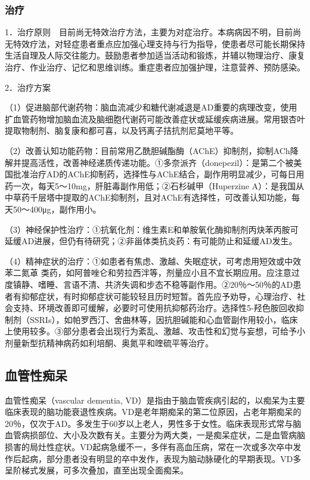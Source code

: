\subsubsection{治疗}

1．治疗原则　目前尚无特效治疗方法，主要为对症治疗。本病病因不明，目前尚无特效疗法，对轻症患者重点应加强心理支持与行为指导，使患者尽可能长期保持生活自理及人际交往能力。鼓励患者参加适当活动和锻炼，并辅以物理治疗、康复治疗、作业治疗、记忆和思维训练。重症患者应加强护理，注意营养、预防感染。

2．治疗方案

（1）促进脑部代谢药物：脑血流减少和糖代谢减退是AD重要的病理改变，使用扩血管药物增加脑血流及脑细胞代谢药可能改善症状或延缓疾病进展。常用银杏叶提取物制剂、脑复康和都可喜，以及钙离子拮抗剂尼莫地平等。

（2）改善认知功能药物：目前常用乙酰胆碱酯酶（AChE）抑制剂，抑制ACh降解并提高活性，改善神经递质传递功能。①多奈派齐（donepezil）：是第二个被美国批准治疗AD的AChE抑制药，选择性与AChE结合，副作用明显减少，可每日用药一次，每天5～10mg，肝脏毒副作用低；②石杉碱甲（Huperzine
A）：是我国从中草药千层塔中提取的AChE抑制剂，且对AChE有选择性，可改善认知功能，每天50～400μg，副作用小。

（3）神经保护性治疗：①抗氧化剂：维生素E和单胺氧化酶抑制剂丙炔苯丙胺可延缓AD进展，但仍有待研究；②非甾体类抗炎药：有可能防止和延缓AD发生。

（4）精神症状的治疗：①如患者有焦虑、激越、失眠症状，可考虑用短效或中效苯二氮䓬
类药，如阿普唑仑和劳拉西泮等，剂量应小且不宜长期应用。应注意过度镇静、嗜睡、言语不清、共济失调和步态不稳等副作用。②20％～50％的AD患者有抑郁症状，有时抑郁症状可能较轻且历时短暂。首先应予劝导，心理治疗、社会支持、环境改善即可缓解，必要时可使用抗抑郁药治疗。选择性5-羟色胺回收抑制剂（SSRIs），如帕罗西汀、舍曲林等，因抗胆碱能和心血管副作用较小，临床上使用较多。③部分患者会出现行为紊乱、激越、攻击性和幻觉与妄想，可给予小剂量新型抗精神病药如利培酮、奥氮平和喹硫平等治疗。

\subsection{血管性痴呆}

血管性痴呆（vascular dementia,
VD）是指由于脑血管疾病引起的，以痴呆为主要临床表现的脑功能衰退性疾病。VD是老年期痴呆的第二位原因，占老年期痴呆的20％，仅次于AD。多发生于60岁以上老人，男性多于女性。临床表现形式常与脑血管病损部位、大小及次数有关。主要分为两大类，一是痴呆症状，二是血管病脑损害的局灶性症状。VD起病急缓不一，多伴有高血压病，常在一次或多次卒中发作后起病，部分患者没有明显的卒中发作，表现为脑动脉硬化的早期表现。VD多呈阶梯式发展，可多次叠加，直至出现全面痴呆。


